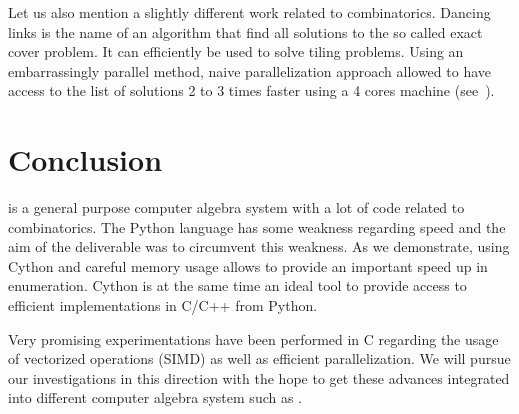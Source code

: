 \documentclass{deliverablereport}
\begin{document}
Let us also mention a slightly different work related to combinatorics.
Dancing links is the name of an algorithm that find all solutions to
the so called exact cover problem. It can efficiently be used to
solve tiling problems. Using an embarrassingly parallel method,
naive parallelization approach allowed to have access to the list
of solutions 2 to 3 times faster using a 4 cores machine
(see~\cite{trac-25125}).


\section{Conclusion}
\Sage is a general purpose computer algebra system with a lot of code related
to combinatorics. The Python language has some weakness regarding speed and the
aim of the deliverable was to circumvent this weakness. As we demonstrate,
using Cython and careful memory usage allows to provide an
important speed up in enumeration. Cython is at the same time an ideal
tool to provide access to efficient implementations in C/C++ from Python.

Very promising experimentations have been performed in C regarding
the usage of vectorized operations (SIMD) as well as efficient
parallelization. We will pursue our investigations in this direction
with the hope to get these advances integrated into different
computer algebra system such as \Sage.

\printbibliography
\end{document}
